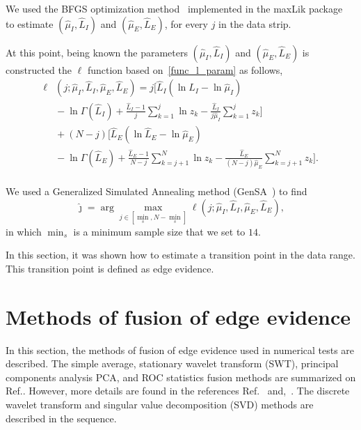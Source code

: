 \documentclass[journal]{IEEEtran}
\begin{document}
We used the BFGS optimization method~\cite{nw} implemented in the maxLik package~\cite{ht} to estimate $(\widehat{\mu}_I, \widehat{L}_I)$ and $(\widehat{\mu}_E, \widehat{L}_E)$, for every $j$ in the data strip.

At this point, being known the parameters $(\widehat{\mu}_I, \widehat{L}_I)$ and $(\widehat{\mu}_E, \widehat{L}_E)$ is constructed the $\ell$ function based on~\eqref{func_l_param} as follows,
\begin{equation}\label{l_com_paremetros}
 \begin{split}
\ell&(j;\widehat{\mu}_I, \widehat{L}_I,\widehat{\mu}_E, \widehat{L}_E)=j\Bigg[  \widehat{L}_I(\ln \widehat{L}_I -\ln \widehat{\mu}_I) \\
                                          &{}- \ln \Gamma(\widehat{L}_I) + \frac{\widehat{L}_I  - 1}{j} \sum_{k=1}^{j}  \ln z_k -\frac{\widehat{L}_I}{j\widehat{\mu}_I} \sum_{k=1}^{j}   z_k\Bigg] \\
                                   &{}+(N-j)\Bigg[\widehat{L}_E(\ln \widehat{L}_E - \ln \widehat{\mu}_E)\\
                                   &{}-\ln \Gamma(\widehat{L}_E) + \frac{\widehat{L}_E - 1}{N-j} \sum_{k=j+1}^{N}\ln z_k
                                   -\frac{\widehat{L}_E}{(N-j)\widehat{\mu}_E} \sum_{k=j+1}^{N}z_k\Bigg]. \\
 \end{split}
 \end{equation}
 
We used a Generalized Simulated Annealing method (GenSA~\cite{xgsh}) to find  
$$
\widehat{\jmath}= \arg\max\limits_{j\in [\min_s,N-\min_s]}\ell(j;\widehat{\mu}_I, \widehat{L}_I,\widehat{\mu}_E, \widehat{L}_E),
$$ 
in which $\min_s$ is a minimum sample size that we set to $14$.

In this section, it was shown how to estimate a transition point in the data range. This transition point is defined as edge evidence. 

\section{Methods of fusion of edge evidence}\label{sec_03}

In this section, the methods of fusion of edge evidence used in numerical tests are described. The simple average, stationary wavelet transform (SWT), principal components analysis PCA, and ROC statistics fusion methods are summarized on Ref.\cite{bmf_2019}. However, more details are found in the references Ref.~\cite{n_r,mit,gs} and,~\cite{fawcett}. The discrete wavelet transform and singular value decomposition (SVD) methods are described in the sequence.
\end{document}
